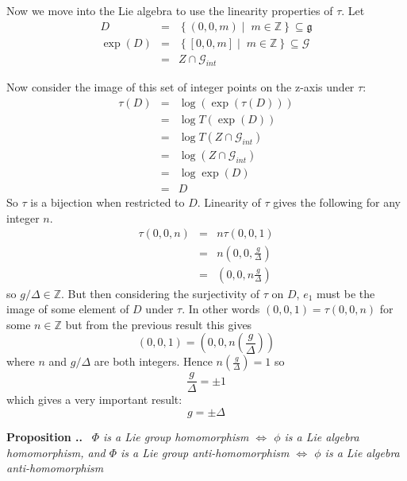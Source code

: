\documentclass[honours]{UNSWthesis}
\newcommand{\Z}{\mathbb{Z}}
\newcommand{\G}{\mathcal{G}}
\newcommand{\g}{\mathfrak{g}}
\newcommand{\1}{\mathbf{e}_{1}}
\newcommand{\2}{\mathbf{e}_{3}}
\newcommand{\3}{\mathbf{e}_{3}}
\newcounter{Item}[section]
\newenvironment{Proposition}{\medskip
                            \refstepcounter{Item}
                            \noindent
                           {\bf Proposition \thesection.\theItem.}\ %
                            \begingroup \sl}
                           {\endgroup\medskip}
\begin{document}
Now we move into the Lie algebra to use the linearity properties of $\tau$.
Let 
\begin{eqnarray*}
D &=& \left\lbrace (0,0,m)\; \big| \;\; m \in \Z \right\rbrace \subseteq \g \\
\exp (D) &=& \left\lbrace [0,0,m] \; \big| \;\; m \in \Z \right\rbrace \subseteq \G \\
&=& Z \cap \G_{int}
\end{eqnarray*}

Now consider the image of this set of integer points on the z-axis under $\tau$:
\begin{eqnarray*}
\tau(D)&=& \log(\exp (\tau(D))) \\
&=& \log T(\exp (D)) \\
&=& \log T(Z \cap \G_{int}) \\
&=& \log (Z \cap \G_{int}) \\
&=& \log \exp (D) \\
&=& D
\end{eqnarray*}
So $\tau$ is a bijection when restricted to $D$. Linearity of $\tau$ gives the following for any integer $n$.
\begin{eqnarray*}
\tau (0,0,n) &=& n \tau (0,0,1) \\
&=& n\left(0,0, \frac{g}{\Delta}\right) \\
&=& \left(0,0, n \frac{g}{\Delta}\right)
\end{eqnarray*}
so $g/\Delta \in \Z$. But then considering the surjectivity of $\tau$ on $D$, $e_{1}$ must be the image of some element of $D$ under $\tau$. In other words $(0,0,1)=\tau(0,0,n)$ for some $n \in \Z$ but from the previous result this gives 
\[
(0,0,1)=\left(0,0, n\left(\frac{g}{\Delta}\right)\right)
\]
where $n$ and $g/\Delta$ are both integers. Hence $n \left( \frac{g}{\Delta}\right)=1$ so 
\[
\frac{g}{\Delta}= \pm 1
\]
which gives a very important result:
\[
g=\pm \Delta
\]

\begin{Proposition}
$\Phi$ is a Lie group homomorphism $\iff$ $\phi$ is a Lie algebra homomorphism, and $\Phi$ is a Lie group anti-homomorphism $\iff$ $\phi$ is a Lie algebra anti-homomorphism
\end{Proposition}
\end{document}

